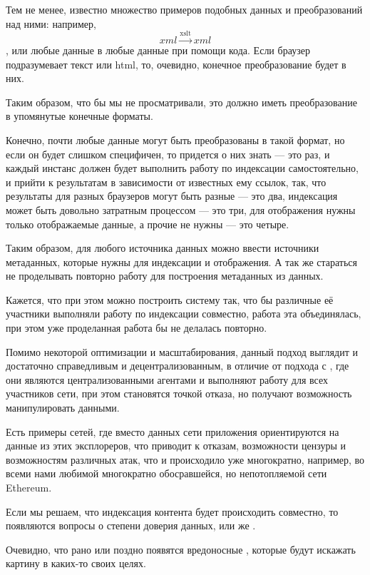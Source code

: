 Тем не менее, известно множество примеров подобных данных и преобразований над
ними: например, \[ xml \xrightarrow{\text{xslt}} xml \], или любые данные в
любые данные при помощи кода. Если браузер подразумевает текст или html, то,
очевидно, конечное преобразование будет в них.

Таким образом, что бы мы не просматривали, это должно иметь преобразование в
упомянутые конечные форматы.

Конечно, почти любые данные могут быть преобразованы в такой формат, но если он
будет слишком специфичен, то  придется о них
знать --- это раз, и каждый инстанс  должен
будет выполнить работу по индексации самостоятельно, и прийти к результатам в
зависимости от известных ему ссылок, так, что результаты для разных браузеров
могут быть разные --- это два, индексация может быть довольно затратным
процессом --- это три, для отображения нужны только отображаемые данные, а
прочие не нужны --- это четыре.

Таким образом, для любого источника данных можно ввести источники метаданных,
которые нужны для индексации и отображения. А так же стараться не проделывать
повторно работу для построения метаданных из данных.

Кажется, что при этом можно построить систему так, что бы различные её участники
выполняли работу по индексации совместно, работа эта объединялась, при этом уже
проделанная работа бы не делалась повторно.

Помимо некоторой оптимизации и масштабирования, данный подход выглядит и
достаточно справедливым и децентрализованным, в отличие от подхода с
, где они являются
централизованными агентами и выполняют работу для всех участников сети, при этом
становятся точкой отказа, но получают возможность манипулировать данными.

Есть примеры сетей, где вместо данных сети приложения ориентируются на данные из
этих эксплореров, что приводит к отказам, возможности цензуры и возможностям
различных атак, что и происходило уже многократно, например, во всеми нами
любимой многократно обосравшейся, но непотопляемой сети Ethereum.

Если мы решаем, что индексация контента будет происходить совместно, то
появляются вопросы о степени доверия  данных, или же
.

Очевидно, что рано или поздно появятся вредоносные ,
которые будут искажать картину в каких-то своих целях.

